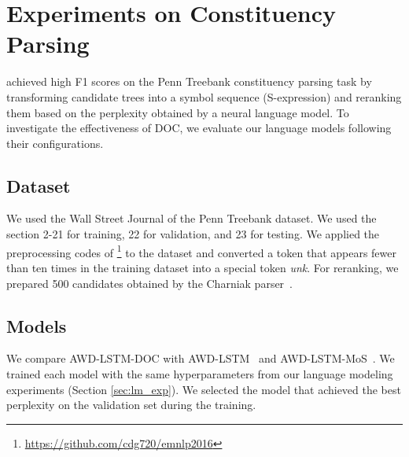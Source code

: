 \documentclass[11pt,a4paper]{article}
\begin{document}
\section{Experiments on Constituency Parsing} \label{sec:exp_in_parsing}
 achieved high F1 scores on the Penn Treebank constituency parsing task by transforming candidate trees into a symbol sequence (S-expression) and reranking them based on the perplexity obtained by a neural language model.
To investigate the effectiveness of DOC, we evaluate our language models following their configurations.

\subsection{Dataset}
We used the Wall Street Journal of the Penn Treebank dataset.
We used the section 2-21 for training, 22 for validation, and 23 for testing.
We applied the preprocessing codes of \footnote{\href{https://github.com/cdg720/emnlp2016}{https://github.com/cdg720/emnlp2016}} to the dataset and converted a token that appears fewer than ten times in the training dataset into a special token {\it unk}.
For reranking, we prepared 500 candidates obtained by the Charniak parser~\cite{A00-2018}.


\subsection{Models}
We compare AWD-LSTM-DOC with AWD-LSTM~\cite{merityRegOpt} and AWD-LSTM-MoS~\cite{DBLP:journals/corr/abs-1711-03953}.
We trained each model with the same hyperparameters from our language modeling experiments (Section \ref{sec:lm_exp}).
We selected the model that achieved the best perplexity on the validation set during the training.
\end{document}
